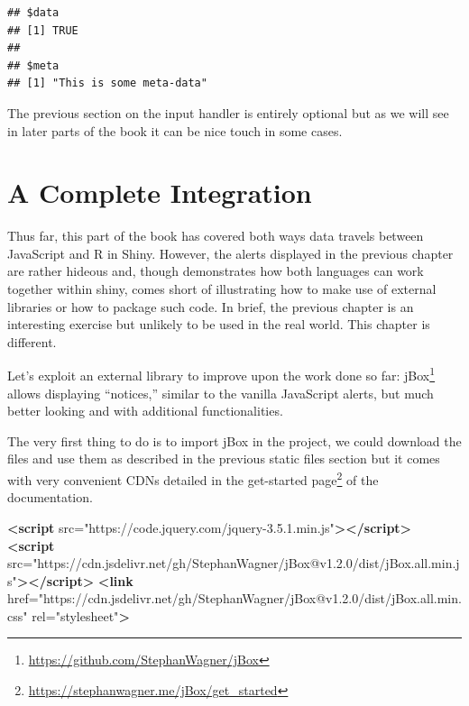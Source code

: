 \documentclass[
]{krantz}
\makeatletter
\newenvironment{Shaded}{\begin{snugshade}}{\end{snugshade}}
\newcommand{\KeywordTok}[1]{\textcolor[rgb]{0.27,0.27,0.27}{\textbf{#1}}}
\newcommand{\OtherTok}[1]{\textcolor[rgb]{0.37,0.37,0.37}{#1}}
\newcommand{\StringTok}[1]{\textcolor[rgb]{0.5,0.5,0.5}{#1}}
\renewcommand{\href}[2]{#2\footnote{\url{#1}}}
\newenvironment{kframe}{%
\medskip{}
\setlength{\fboxsep}{.8em}
 \def\at@end@of@kframe{}%
 \ifinner\ifhmode%
  \def\at@end@of@kframe{\end{minipage}}%
  \begin{minipage}{\columnwidth}%
 \fi\fi%
 \def\FrameCommand##1{\hskip\@totalleftmargin \hskip-\fboxsep
 \colorbox{shadecolor}{##1}\hskip-\fboxsep
     \hskip-\linewidth \hskip-\@totalleftmargin \hskip\columnwidth}%
 \MakeFramed {\advance\hsize-\width
   \@totalleftmargin\z@ \linewidth\hsize
   \@setminipage}}%
 {\par\unskip\endMakeFramed%
 \at@end@of@kframe}
\renewenvironment{Shaded}{\begin{kframe}}{\end{kframe}}
\makeatother
\begin{document}
\begin{verbatim}
## $data
## [1] TRUE
## 
## $meta
## [1] "This is some meta-data"
\end{verbatim}

The previous section on the input handler is entirely optional but as we will see in later parts of the book it can be nice touch in some cases.

\hypertarget{shiny-complete}{%
\chapter{A Complete Integration}\label{shiny-complete}}

Thus far, this part of the book has covered both ways data travels between JavaScript and R in Shiny. However, the alerts displayed in the previous chapter are rather hideous and, though demonstrates how both languages can work together within shiny, comes short of illustrating how to make use of external libraries or how to package such code. In brief, the previous chapter is an interesting exercise but unlikely to be used in the real world. This chapter is different.

Let's exploit an external library to improve upon the work done so far: \href{https://github.com/StephanWagner/jBox}{jBox} allows displaying ``notices,'' similar to the vanilla JavaScript alerts, but much better looking and with additional functionalities.

The very first thing to do is to import jBox in the project, we could download the files and use them as described in the previous static files section but it comes with very convenient CDNs detailed in the \href{https://stephanwagner.me/jBox/get_started}{get-started page} of the documentation.

\begin{Shaded}
\begin{Highlighting}[]
\KeywordTok{\textless{}script}\OtherTok{ src=}\StringTok{"https://code.jquery.com/jquery{-}3.5.1.min.js"}\KeywordTok{\textgreater{}\textless{}/script\textgreater{}}
\KeywordTok{\textless{}script}\OtherTok{ src=}\StringTok{"https://cdn.jsdelivr.net/gh/StephanWagner/jBox@v1.2.0/dist/jBox.all.min.js"}\KeywordTok{\textgreater{}\textless{}/script\textgreater{}}
\KeywordTok{\textless{}link}\OtherTok{ href=}\StringTok{"https://cdn.jsdelivr.net/gh/StephanWagner/jBox@v1.2.0/dist/jBox.all.min.css"}\OtherTok{ rel=}\StringTok{"stylesheet"}\KeywordTok{\textgreater{}}
\end{Highlighting}
\end{Shaded}
\end{document}
